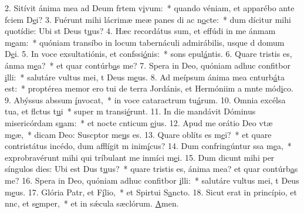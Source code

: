2. Sitívit ánima mea ad Deum frtem v\uline{i}vum:~* quando véniam, et apparébo ante fciem D\uline{e}i?
3. Fuérunt mihi lácrimæ meæ panes di ac n\uline{o}cte:~* dum dícitur mihi quotídie: Ubi st Deus t\uline{u}us?
4. Hæc recordátus sum, et effúdi in me ánmam m\uline{e}am:~* quóniam transíbo in locum tabernáculi admirábilis, usque d domum D\uline{e}i.
5. In voce exsultatiónis, et confssi\uline{ó}nis:~* sons epul\uline{á}ntis.
6. Quare tristis es, ánma m\uline{e}a?~* et quar contúrb\uline{a}s me?
7. Spera in Deo, quóniam adhuc confitbor \uline{i}lli:~* salutáre vultus mei, t Deus m\uline{e}us.
8. Ad meípsum ánima mea cnturb\uline{á}ta est:~* proptérea memor ero tui de terra Jordánis, et Hermóniim a mnte mód\uline{i}co.
9. Abýssus abssum \uline{í}nvocat,~* in voce cataractrum tu\uline{á}rum.
10. Omnia excélsa tua, et flctus t\uline{u}i~* super m transi\uline{é}runt.
11. In die mandávit Dóminus misericórdam s\uline{u}am:~* et nocte cnticum \uline{e}jus.
12. Apud me orátio Deo vtæ m\uline{e}æ,~* dicam Deo: Suscptor me\uline{u}s es.
13. Quare oblíts es m\uline{e}i?~* et quare contristátus incédo, dum afflígit m inim\uline{í}cus?
14. Dum confringúntur ssa m\uline{e}a,~* exprobravérunt mihi qui tríbulant me inmíci m\uline{e}i.
15. Dum dicunt mihi per síngulos dies: Ubi est Dus t\uline{u}us?~* quare tristis es, ánima mea? et quar contúrb\uline{a}s me?
16. Spera in Deo, quóniam adhuc confitbor \uline{i}lli:~* salutáre vultus mei, t Deus m\uline{e}us.
17. Glória Patr, et F\uline{í}lio,~* et Spirtui S\uline{a}ncto.
18. Sicut erat in princípio, et nnc, et s\uline{e}mper,~* et in sǽcula sæclórum. \uline{A}men.
